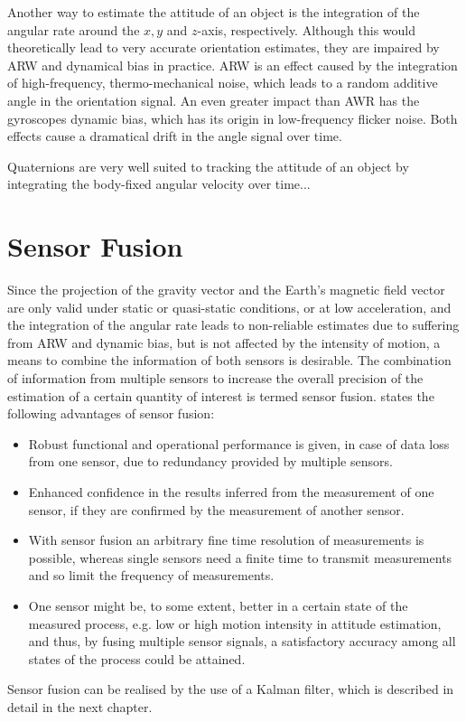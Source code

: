 Another way to estimate the attitude of an object is the integration of the angular rate around the $x, y$ and $z$-axis, respectively. Although this would theoretically lead to very accurate orientation estimates, they are impaired by \gls{ARW} and dynamical bias in practice. \gls{ARW} is an effect caused by the integration of high-frequency, thermo-mechanical noise, which leads to a random additive angle in the orientation signal. An even greater impact than AWR has the gyroscopes dynamic bias, which has its origin in low-frequency flicker noise. Both effects cause a dramatical drift in the angle signal over time.

Quaternions are very well suited to tracking the attitude of an object by integrating the body-fixed angular velocity over time...

\section{Sensor Fusion}

Since the projection of the gravity vector and the Earth's magnetic field vector are only valid under static or quasi-static conditions, or at low acceleration, and the integration of the angular rate leads to non-reliable estimates due to suffering from \gls{ARW} and dynamic bias, but is not affected by the intensity of motion, a means to combine the information of both sensors is desirable. The combination of information from multiple sensors to increase the overall precision of the estimation of a certain quantity of interest is termed sensor fusion. \citeauthor{raol2009multi} \cite{raol2009multi} states the following advantages of sensor fusion:
 
\begin{itemize}
\item Robust functional and operational performance is given, in case of data loss from one sensor, due to redundancy provided by multiple sensors.
\item Enhanced confidence in the results inferred from the measurement of one sensor, if they are confirmed by the measurement of another sensor.
\item With sensor fusion an arbitrary fine time resolution of measurements is possible, whereas single sensors need a finite time to transmit measurements and so limit the frequency of measurements.
\item One sensor might be, to some extent, better in a certain state of the measured process, e.g. low or high motion intensity in attitude estimation, and thus, by fusing multiple sensor signals, a satisfactory accuracy among all states of the process could be attained.
\end{itemize}

\noindent
Sensor fusion can be realised by the use of a Kalman filter, which is described in detail in the next chapter.


